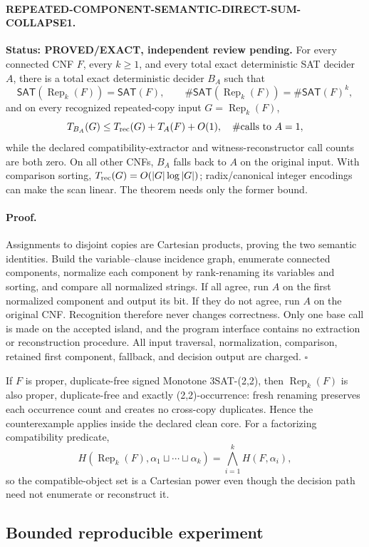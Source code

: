 \documentclass[11pt]{article}
\newcommand{\SAT}{\mathsf{SAT}}
\newcommand{\Rep}{\operatorname{Rep}}
\newcommand{\EXACT}{\textbf{PROVED/EXACT}}
\begin{document}
\paragraph{REPEATED-COMPONENT-SEMANTIC-DIRECT-SUM-COLLAPSE1.}
\textbf{Status: \EXACT, independent review pending.}  For every connected CNF
\(F\), every \(k\geq1\), and every total exact deterministic SAT decider
\(A\), there is a total exact deterministic decider \(B_A\) such that
\[
 \SAT(\Rep_k(F))=\SAT(F),\qquad
 \#\SAT(\Rep_k(F))=\#\SAT(F)^k,
\]
and on every recognized repeated-copy input \(G=\Rep_k(F)\),
\[
 T_{B_A}(G)\leq T_{\rm rec}(G)+T_A(F)+O(1),\quad
 \#\text{calls to }A=1,
\]
while the declared compatibility-extractor and witness-reconstructor call
counts are both zero.  On all other CNFs, \(B_A\) falls back to \(A\) on the
original input.  With comparison sorting,
\(T_{\rm rec}(G)=O(|G|\log |G|)\); radix/canonical integer encodings can make
the scan linear.  The theorem needs only the former bound.

\paragraph{Proof.}
Assignments to disjoint copies are Cartesian products, proving the two
semantic identities.  Build the variable--clause incidence graph, enumerate
connected components, normalize each component by rank-renaming its variables
and sorting, and compare all normalized strings.  If all agree, run \(A\) on
the first normalized component and output its bit.  If they do not agree, run
\(A\) on the original CNF.  Recognition therefore never changes correctness.
Only one base call is made on the accepted island, and the program interface
contains no extraction or reconstruction procedure.  All input traversal,
normalization, comparison, retained first component, fallback, and decision
output are charged. \(\square\)

If \(F\) is proper, duplicate-free signed Monotone 3SAT-(2,2), then
\(\Rep_k(F)\) is also proper, duplicate-free and exactly (2,2)-occurrence:
fresh renaming preserves each occurrence count and creates no cross-copy
duplicates.  Hence the counterexample applies inside the declared clean core.
For a factorizing compatibility predicate,
\[
 H(\Rep_k(F),\alpha_1\sqcup\cdots\sqcup\alpha_k)
 =\bigwedge_{i=1}^k H(F,\alpha_i),
\]
so the compatible-object set is a Cartesian power even though the decision
path need not enumerate or reconstruct it.

\subsection*{Bounded reproducible experiment}
\end{document}
